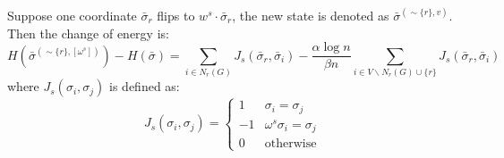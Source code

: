 \documentclass{ctexart}
\begin{document}
	Suppose one coordinate $\bar{\sigma}_r$ flips to $w^s \cdot \bar{\sigma}_r$, the new state is denoted as $\bar{\sigma}^{(\sim \{r\}, v)}$.
	Then the change of energy is:
	\begin{equation}\label{eq:delta_H}
	 H(\bar{\sigma}^{(\sim \{r\}, [\omega^s])}) - H(\bar{\sigma}) = \sum_{i \in N_r(G)} J_s(\bar{\sigma}_r, \bar{\sigma}_i) - \frac{\alpha \log n}{\beta n} \sum_{i \in V\backslash N_r(G)\cup\{r\}} J_s(\bar{\sigma}_r,\bar{\sigma}_i)
	\end{equation}
	where $J_s(\sigma_i, \sigma_j)$ is defined as:
	\begin{equation}
	J_s(\sigma_i, \sigma_j) = \begin{cases}
	1 & \sigma_i = \sigma_j \\
	-1 & \omega^s \sigma_i = \sigma_j \\
	0 & \textrm {otherwise}
	\end{cases}
	\end{equation}
\end{document}

